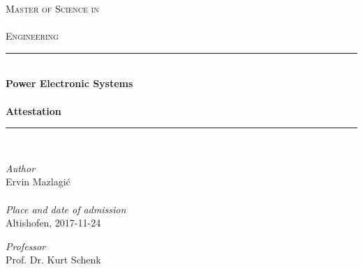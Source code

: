 \thispagestyle{empty}
\begin{titlepage}

\begin{center}

\textsc{
	\LARGE Master of Science in\\~\\Engineering}\\[1.5cm]
\vfill{}
\newcommand{\HRule}{\rule{\linewidth}{0.5mm}}
\HRule
\\[0.4cm]
{
	\Huge \bfseries Power Electronic Systems \\
        ~\\
        \large Attestation}
\\[0.4cm]
\HRule
\\[0.5cm]

	\large 

\vfill{}

\begin{minipage}{0.4\textwidth}
    \begin{flushleft} \large
	\emph{Author}\\
        Ervin Mazlagi\'c\\ ~ \\
	\emph{Place and date of admission}\\
	Altishofen, 2017-11-24
    \end{flushleft}
\end{minipage}
\hfill
\begin{minipage}{0.4\textwidth}
    \begin{flushright} \large
        \emph{Professor} \\
        Prof. Dr. Kurt Schenk \\ ~ \\
    \end{flushright}
\end{minipage}

\end{center}

\end{titlepage}
